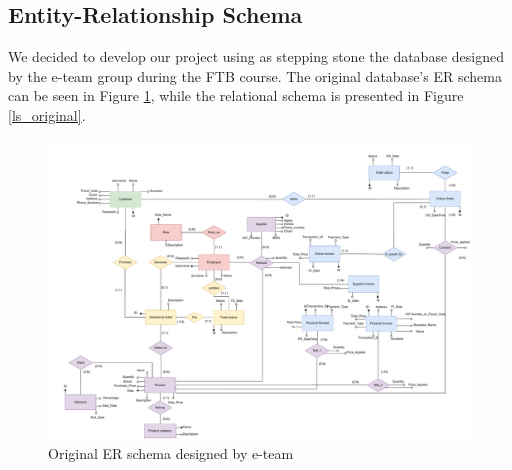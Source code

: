 \subsection{Entity-Relationship Schema}

We decided to develop our project using as stepping stone the database designed by the e-team group during the FTB course. The original database's ER schema can be seen in Figure \ref{er_original}, while the relational schema is presented in Figure \ref{ls_original}.
\\
\begin{figure}[H]
\centering
\includegraphics[width=\textwidth]{Schemas/ER_original.drawio.pdf}
\caption{Original ER schema designed by e-team}
\label{er_original}
\end{figure}

